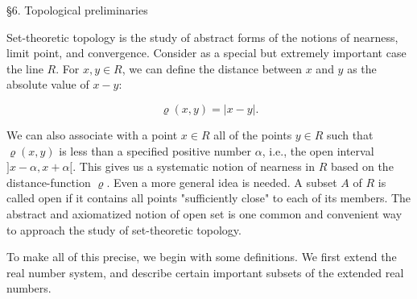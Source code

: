 §6. Topological preliminaries

Set-theoretic topology is the study of abstract forms of the notions of nearness, limit point, and convergence. Consider as a special but extremely important case the line $R$. For $x, y \in R$, we can define the distance between $x$ and $y$ as the absolute value of $x - y$:

$$\varrho(x, y) = |x - y|.$$

We can also associate with a point $x \in R$ all of the points $y \in R$ such that $\varrho(x, y)$ is less than a specified positive number $\alpha$, i.e., the open interval $]x - \alpha, x + \alpha[$. This gives us a systematic notion of nearness in $R$ based on the distance-function $\varrho$. Even a more general idea is needed. A subset $A$ of $R$ is called open if it contains all points "sufficiently close" to each of its members. The abstract and axiomatized notion of open set is one common and convenient way to approach the study of set-theoretic topology.

To make all of this precise, we begin with some definitions. We first extend the real number system, and describe certain important subsets of the extended real numbers.